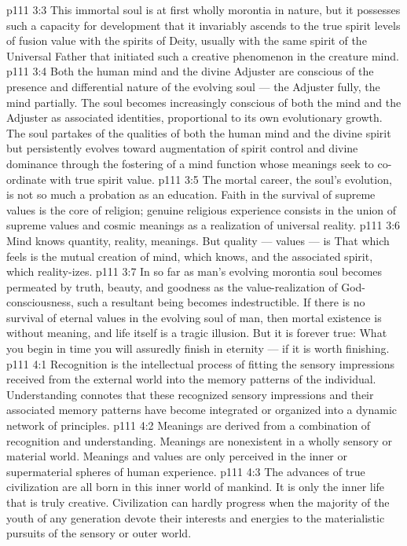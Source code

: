 \vs p111 3:3 This immortal soul is at first wholly morontia in nature, but it possesses such a capacity for development that it invariably ascends to the true spirit levels of fusion value with the spirits of Deity, usually with the same spirit of the Universal Father that initiated such a creative phenomenon in the creature mind.
\vs p111 3:4 Both the human mind and the divine Adjuster are conscious of the presence and differential nature of the evolving soul --- the Adjuster fully, the mind partially. The soul becomes increasingly conscious of both the mind and the Adjuster as associated identities, proportional to its own evolutionary growth. The soul partakes of the qualities of both the human mind and the divine spirit but persistently evolves toward augmentation of spirit control and divine dominance through the fostering of a mind function whose meanings seek to co\hyp{}ordinate with true spirit value.
\vs p111 3:5 The mortal career, the soul’s evolution, is not so much a probation as an education. Faith in the survival of supreme values is the core of religion; genuine religious experience consists in the union of supreme values and cosmic meanings as a realization of universal reality.
\vs p111 3:6 Mind knows quantity, reality, meanings. But quality --- values --- is  That which feels is the mutual creation of mind, which knows, and the associated spirit, which reality\hyp{}izes.
\vs p111 3:7 In so far as man’s evolving morontia soul becomes permeated by truth, beauty, and goodness as the value\hyp{}realization of God\hyp{}consciousness, such a resultant being becomes indestructible. If there is no survival of eternal values in the evolving soul of man, then mortal existence is without meaning, and life itself is a tragic illusion. But it is forever true: What you begin in time you will assuredly finish in eternity --- if it is worth finishing.
\vs p111 4:1 Recognition is the intellectual process of fitting the sensory impressions received from the external world into the memory patterns of the individual. Understanding connotes that these recognized sensory impressions and their associated memory patterns have become integrated or organized into a dynamic network of principles.
\vs p111 4:2 Meanings are derived from a combination of recognition and understanding. Meanings are nonexistent in a wholly sensory or material world. Meanings and values are only perceived in the inner or supermaterial spheres of human experience.
\vs p111 4:3 \pc The advances of true civilization are all born in this inner world of mankind. It is only the inner life that is truly creative. Civilization can hardly progress when the majority of the youth of any generation devote their interests and energies to the materialistic pursuits of the sensory or outer world.
